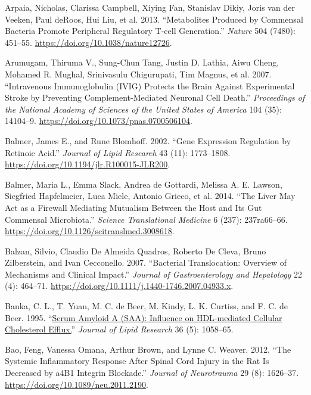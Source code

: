\documentclass[9pt,lineno]{elife}
\newlength{\cslhangindent}
\newlength{\cslentryspacingunit} %
\newenvironment{CSLReferences}[2] %
 {%
  \setlength{\parindent}{0pt}
  \ifodd #1
  \let\oldpar\par
  \def\par{\hangindent=\cslhangindent\oldpar}
  \fi
  \setlength{\parskip}{#2\cslentryspacingunit}
 }%
 {}
\begin{document}
\begin{CSLReferences}{1}{0}
\leavevmode{}%
Arpaia, Nicholas, Clarissa Campbell, Xiying Fan, Stanislav Dikiy, Joris van der Veeken, Paul deRoos, Hui Liu, et al. 2013. {``Metabolites Produced by Commensal Bacteria Promote Peripheral Regulatory {T-cell} Generation.''} \emph{Nature} 504 (7480): 451--55. \url{https://doi.org/10.1038/nature12726}.

\leavevmode{}%
Arumugam, Thiruma V., Sung-Chun Tang, Justin D. Lathia, Aiwu Cheng, Mohamed R. Mughal, Srinivasulu Chigurupati, Tim Magnus, et al. 2007. {``Intravenous Immunoglobulin ({IVIG}) Protects the Brain Against Experimental Stroke by Preventing Complement-Mediated Neuronal Cell Death.''} \emph{Proceedings of the National Academy of Sciences of the United States of America} 104 (35): 14104--9. \url{https://doi.org/10.1073/pnas.0700506104}.

\leavevmode{}%
Balmer, James E., and Rune Blomhoff. 2002. {``Gene Expression Regulation by Retinoic Acid.''} \emph{Journal of Lipid Research} 43 (11): 1773--1808. \url{https://doi.org/10.1194/jlr.R100015-JLR200}.

\leavevmode{}%
Balmer, Maria L., Emma Slack, Andrea de Gottardi, Melissa A. E. Lawson, Siegfried Hapfelmeier, Luca Miele, Antonio Grieco, et al. 2014. {``The {Liver May Act} as a {Firewall Mediating Mutualism Between} the {Host} and {Its Gut Commensal Microbiota}.''} \emph{Science Translational Medicine} 6 (237): 237ra66--66. \url{https://doi.org/10.1126/scitranslmed.3008618}.

\leavevmode{}%
Balzan, Silvio, Claudio De Almeida Quadros, Roberto De Cleva, Bruno Zilberstein, and Ivan Cecconello. 2007. {``Bacterial Translocation: {Overview} of Mechanisms and Clinical Impact.''} \emph{Journal of Gastroenterology and Hepatology} 22 (4): 464--71. \url{https://doi.org/10.1111/j.1440-1746.2007.04933.x}.

\leavevmode{}%
Banka, C. L., T. Yuan, M. C. de Beer, M. Kindy, L. K. Curtiss, and F. C. de Beer. 1995. {``\href{https://www.ncbi.nlm.nih.gov/pubmed/7658153}{Serum Amyloid {A} ({SAA}): Influence on {HDL-mediated} Cellular Cholesterol Efflux.}''} \emph{Journal of Lipid Research} 36 (5): 1058--65.

\leavevmode{}%
Bao, Feng, Vanessa Omana, Arthur Brown, and Lynne C. Weaver. 2012. {``The Systemic Inflammatory Response After Spinal Cord Injury in the Rat Is Decreased by {a4B1} Integrin Blockade.''} \emph{Journal of Neurotrauma} 29 (8): 1626--37. \url{https://doi.org/10.1089/neu.2011.2190}.


\end{CSLReferences}
\end{document}
